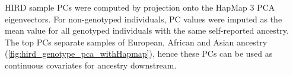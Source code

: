 \gls{HIRD} sample \glspl{PC} were computed by projection onto the HapMap 3 \gls{PCA} eigenvectors.
For non-genotyped individuals, \gls{PC} values were imputed as the mean value for all genotyped individuals with the same self-reported ancestry.
The top \glspl{PC} separate samples of European, African and Asian ancestry (\cref{fig:hird_genotype_pca_withHapmap}), hence these \glspl{PC} can be used as continuous covariates for ancestry downstream.

